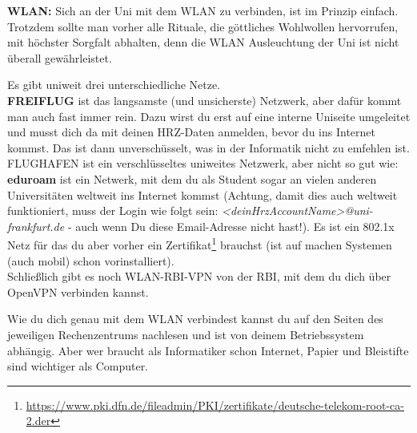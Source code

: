 \textbf{WLAN:}
Sich an der Uni mit dem WLAN zu verbinden, ist im Prinzip einfach.
Trotzdem sollte man vorher alle Rituale, die g\"ottliches Wohlwollen hervorrufen, mit h\"ochster Sorgfalt abhalten,
denn die WLAN Ausleuchtung der Uni ist nicht \"uberall gew\"ahrleistet.

Es gibt uniweit drei unterschiedliche Netze.\\
\textbf{FREIFLUG} ist das langsamste (und unsicherste) Netzwerk, aber daf\"ur kommt man auch fast immer rein. Dazu wirst du erst auf eine interne Uniseite umgeleitet und musst dich da mit deinen HRZ-Daten anmelden, bevor du ins Internet kommst. Das ist dann unversch\"usselt, was in der Informatik nicht zu emfehlen ist.\\
FLUGHAFEN ist ein verschl\"usseltes uniweites Netzwerk, aber nicht so gut wie:\\
\textbf{eduroam} ist ein Netwerk, mit dem du als Student sogar an vielen anderen Universit\"aten weltweit ins Internet kommst (Achtung, damit dies auch weltweit funktioniert, muss der Login wie folgt sein: \textit{<deinHrzAccountName>@uni-frankfurt.de} - auch wenn Du diese Email-Adresse nicht hast!).
Es ist ein 802.1x Netz f\"ur das du aber vorher ein Zertifikat\footnote{\url{https://www.pki.dfn.de/fileadmin/PKI/zertifikate/deutsche-telekom-root-ca-2.der}} brauchst (ist auf machen Systemen (auch mobil) schon vorinstalliert).\\
Schlie{\ss}lich gibt es noch WLAN-RBI-VPN von der RBI, mit dem du dich \"uber OpenVPN verbinden kannst.

Wie du dich genau mit dem WLAN verbindest kannst du auf den Seiten des jeweiligen Rechenzentrums nachlesen und ist von deinem Betriebssystem abh\"angig. Aber wer braucht als Informatiker schon Internet, Papier und Bleistifte sind wichtiger als Computer.






\spaltenende
